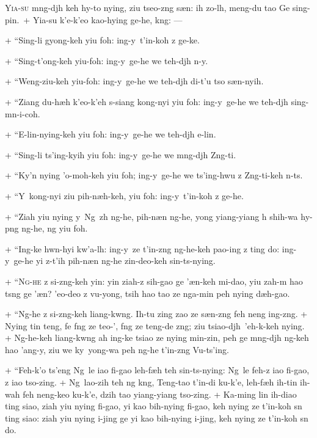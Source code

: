 \header
\lettrine{Y}{ia-su} m\oo ng-dj\oo h keh hy\y-to nying, ziu tseo-z\oo ng s\ae n: ih zo-l\oo h, meng-du tao Ge sing-pin.\
+	Yia-su k'e-k'eo kao-hy\y ing ge-he, k\oo ng: ---
\par
+	``Sing-li gy\y ong-keh yiu foh: ing-y\y\ t'in-koh z ge-ke.
\par
+	``Sing-t'ong-keh yiu-foh: ing-y\y\ ge-he we teh-dj\oo h \e n-y\y.
\par
+	``Weng-ziu-keh yiu-foh: ing-y\y\ ge-he we teh-dj\oo h di-t'u tso s\ae n-nyih.
\par
+	``Ziang du-h\ae h k'eo-k'eh s-siang kong-nyi yiu foh: ing-y\y\ ge-he we teh-dj\oo h sing-m\e n-i-coh.
\par
+	``E-lin-nying-keh yiu foh: ing-y\y\ ge-he we teh-dj\oo h e-lin.
\par
+	``Sing-li ts'ing-kyih yiu foh: ing-y\y\ ge-he we m\oo ng-dj\oo h Z\oo ng-ti.
\par
+	``Ky'\y n nying 'o-moh-keh yiu foh; ing-y\y\ ge-he we ts'ing-hwu z Z\oo ng-ti-keh n-ts.
\par
+	``Y\y\ kong-nyi ziu pih-n\ae h-keh, yiu foh: ing-y\y\ t'in-koh z ge-he.
\par
+	``Ziah yiu nying y\y\ Ng\oo\ z\oo h ng-he, pih-n\ae n ng-he, y\y ong yiang-yiang \oo h shih-wa hy\y-p\oo ng ng-he, ng yiu foh.
\par
+	``Ing-ke hw\e n-hyi kw'a-l\oo h: ing-y\y\ ze t'in-z\oo ng ng-he-keh pao-ing z ting do: ing-y\y\ ge-he yi z-t'ih pih-n\ae n ng-he zin-deo-keh sin-ts-nying.
\par
+	``\textsc{Ng-he} z si-z\oo ng-keh yin: yin ziah-z sih-gao ge '\ae n-keh mi-dao, yiu zah-m hao ts\oo ng ge '\ae n? 'eo-deo z vu-y\y ong, tsih hao tao ze nga-min peh nying d\ae h-gao.
\par
+	``Ng-he z si-z\oo ng-keh liang-kw\oo ng. Ih-tu zing zao ze s\ae n-z\oo ng feh neng ing-z\oo ng.
+	Nying tin teng, fe f\oo ng ze teo-'\oo, f\oo ng ze teng-de z\oo ng; ziu tsiao-dj\oo h\ 'eh-k\oo-keh nying.
+	Ng-he-keh liang-kw\oo ng ah ing-ke tsiao ze nying min-zin, peh ge m\oo ng-dj\oo h ng-keh hao 'ang-y\y, ziu we ky\y\ y\y ong-wa peh ng-he t'in-z\oo ng Vu-ts'ing.
\par
+	``Feh-k'o ts'eng Ng\oo\ le iao fi-gao leh-f\ae h teh sin-ts-nying: Ng\oo\ le feh-z iao fi-gao, z iao tso-zing.
+	Ng\oo\ lao-zih teh ng k\oo ng, Teng-tao t'in-di ku-k'e, leh-f\ae h ih-tin ih-wah feh neng-keo ku-k'e, dzih tao yiang-yiang tso-zing.
+	Ka-ming lin ih-diao ting siao, ziah yiu nying fi-gao, yi kao bih-nying fi-gao, keh nying ze t'in-koh s\e n ting siao: ziah yiu nying i-jing ge yi kao bih-nying i-jing, keh nying ze t'in-koh s\e n do.
